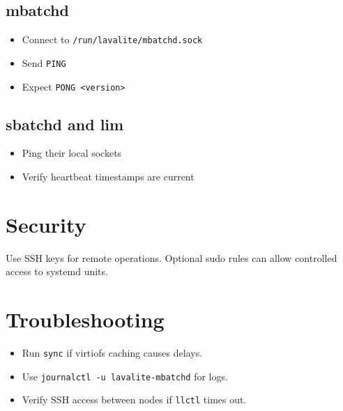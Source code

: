 \documentclass[11pt,a4paper]{article}
\begin{document}
\subsection{\textbf{mbatchd}}
\begin{itemize}
  \item Connect to \texttt{/run/lavalite/mbatchd.sock}
  \item Send \texttt{PING}
  \item Expect \texttt{PONG <version>}
\end{itemize}

\subsection{\textbf{sbatchd and lim}}
\begin{itemize}
  \item Ping their local sockets
  \item Verify heartbeat timestamps are current
\end{itemize}

\section{\textbf{Security}}
Use SSH keys for remote operations. Optional sudo rules can allow controlled access to systemd units.

\section{\textbf{Troubleshooting}}
\begin{itemize}
  \item Run \texttt{sync} if virtiofs caching causes delays.
  \item Use \texttt{journalctl -u lavalite-mbatchd} for logs.
  \item Verify SSH access between nodes if \texttt{llctl} times out.
\end{itemize}
\end{document}

